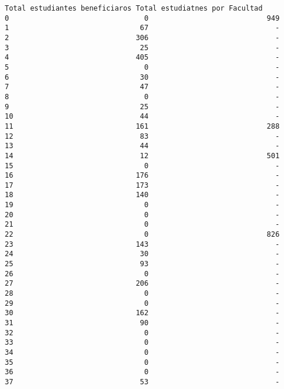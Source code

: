 \documentclass[11pt]{article}
\begin{document}
\begin{Verbatim}[commandchars=\\\{\}]
    Total estudiantes beneficiaros Total estudiatnes por Facultad  
0                                0                            949  
1                               67                              -  
2                              306                              -  
3                               25                              -  
4                              405                              -  
5                                0                              -  
6                               30                              -  
7                               47                              -  
8                                0                              -  
9                               25                              -  
10                              44                              -  
11                             161                            288  
12                              83                              -  
13                              44                              -  
14                              12                            501  
15                               0                              -  
16                             176                              -  
17                             173                              -  
18                             140                              -  
19                               0                              -  
20                               0                              -  
21                               0                              -  
22                               0                            826  
23                             143                              -  
24                              30                              -  
25                              93                              -  
26                               0                              -  
27                             206                              -  
28                               0                              -  
29                               0                              -  
30                             162                              -  
31                              90                              -  
32                               0                              -  
33                               0                              -  
34                               0                              -  
35                               0                              -  
36                               0                              -  
37                              53                              -  

\end{Verbatim}
\end{document}
